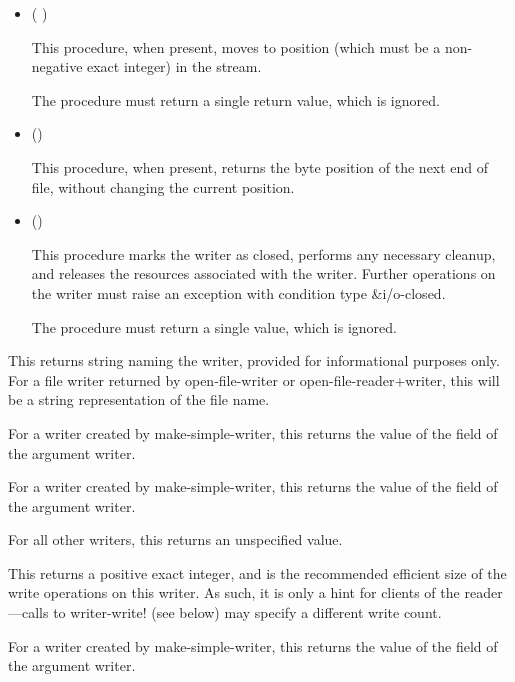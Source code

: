 \begin{entry}{%
}
\begin{itemize}
  This procedure, when present, returns the current position in the byte
  stream as an exact integer counting the number of bytes since the
  beginning of the stream.
   
\item {\cf ( )}
   
  This procedure, when present, moves to position  (which must be a
  non-negative exact integer) in the stream.
  
  The procedure must return a single return value, which is ignored.

\item {\cf ()}
   
    This procedure, when present, returns the byte position of the next end
    of file, without changing the current position.
   
\item {\cf ()}
  
  This procedure marks the writer as closed, performs any necessary
  cleanup, and releases the resources associated with the writer. Further
  operations on the writer must raise an exception with condition type
  {\cf\&i/o-closed}.
   
  The procedure must return a single value, which is ignored.
\end{itemize}
\end{entry}

\begin{entry}{%
}
   
This returns string naming the writer, provided for informational
purposes only. For a file writer returned by {\cf open-file-writer}
or {\cf open-file-reader+writer}, this will be a string
representation of the file name.
   
For a writer created by {\cf make-simple-writer}, this returns the
value of the  field of the argument writer.
\end{entry}

\begin{entry}{%
}
   
  For a writer created by {\cf make-simple-writer}, this returns the value of the
   field of the argument writer.
  
  For all other writers, this returns an unspecified value.
\end{entry}

\begin{entry}{%
}
   
This returns a positive exact integer, and is the recommended efficient
size of the write operations on this writer. As such, it is only a hint for
clients of the reader---calls to {\cf writer-write!} (see below) may specify a
different write count.

For a writer created by {\cf make-simple-writer}, this returns the value of the
 field of the argument writer.
\end{entry}

